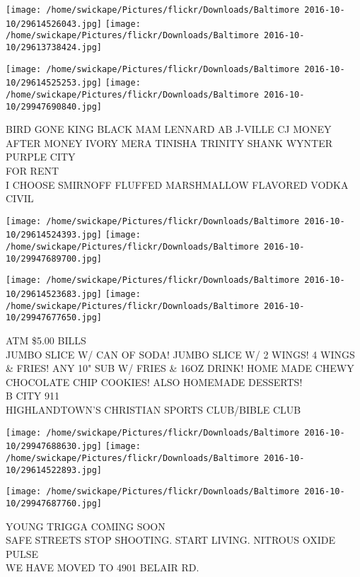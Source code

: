 \documentclass[10pt,letterpaper]{article}
\begin{document}
\texttt{[image: /home/swickape/Pictures/flickr/Downloads/Baltimore 2016-10-10/29614526043.jpg]}
\texttt{[image: /home/swickape/Pictures/flickr/Downloads/Baltimore 2016-10-10/29613738424.jpg]}

\texttt{[image: /home/swickape/Pictures/flickr/Downloads/Baltimore 2016-10-10/29614525253.jpg]}
\texttt{[image: /home/swickape/Pictures/flickr/Downloads/Baltimore 2016-10-10/29947690840.jpg]}

BIRD GONE KING BLACK MAM LENNARD AB J{-}VILLE CJ MONEY AFTER MONEY IVORY MERA TINISHA TRINITY SHANK WYNTER PURPLE CITY\\
FOR RENT\\
I CHOOSE SMIRNOFF FLUFFED MARSHMALLOW FLAVORED VODKA\\
CIVIL\\
\pagebreak

\texttt{[image: /home/swickape/Pictures/flickr/Downloads/Baltimore 2016-10-10/29614524393.jpg]}
\texttt{[image: /home/swickape/Pictures/flickr/Downloads/Baltimore 2016-10-10/29947689700.jpg]}

\texttt{[image: /home/swickape/Pictures/flickr/Downloads/Baltimore 2016-10-10/29614523683.jpg]}
\texttt{[image: /home/swickape/Pictures/flickr/Downloads/Baltimore 2016-10-10/29947677650.jpg]}

ATM \$5.00 BILLS\\
JUMBO SLICE W/ CAN OF SODA! JUMBO SLICE W/ 2 WINGS!    4 WINGS \& FRIES!  ANY 10" SUB W/ FRIES \& 16OZ DRINK!  HOME MADE CHEWY CHOCOLATE CHIP COOKIES!  ALSO HOMEMADE DESSERTS!\\
B CITY 911\\
HIGHLANDTOWN'S CHRISTIAN SPORTS CLUB/BIBLE CLUB\\
\pagebreak

\texttt{[image: /home/swickape/Pictures/flickr/Downloads/Baltimore 2016-10-10/29947688630.jpg]}
\texttt{[image: /home/swickape/Pictures/flickr/Downloads/Baltimore 2016-10-10/29614522893.jpg]}

\texttt{[image: /home/swickape/Pictures/flickr/Downloads/Baltimore 2016-10-10/29947687760.jpg]}

YOUNG TRIGGA COMING SOON\\
SAFE STREETS STOP SHOOTING. START LIVING.  NITROUS OXIDE PULSE\\
WE HAVE MOVED TO 4901 BELAIR RD.\\
\pagebreak
\end{document}
